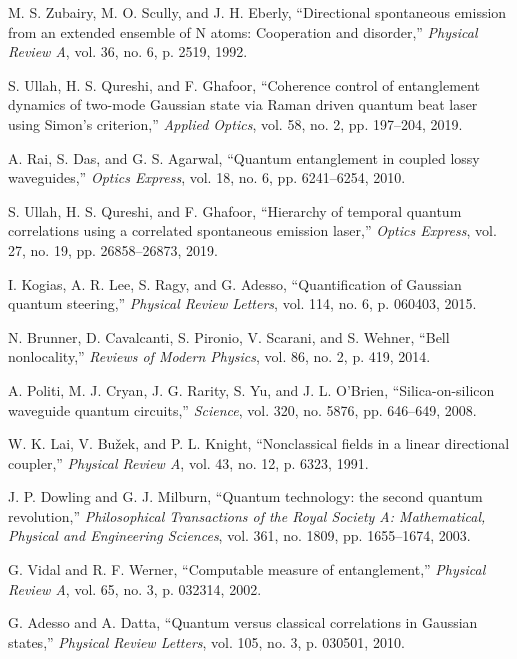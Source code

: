 \begin{thebibliography}{99}
M. S. Zubairy, M. O. Scully, and J. H. Eberly, ``Directional spontaneous emission from an extended ensemble of N atoms: Cooperation and disorder,'' \textit{Physical Review A}, vol. 36, no. 6, p. 2519, 1992.

S. Ullah, H. S. Qureshi, and F. Ghafoor, ``Coherence control of entanglement dynamics of two-mode Gaussian state via Raman driven quantum beat laser using Simon's criterion,'' \textit{Applied Optics}, vol. 58, no. 2, pp. 197--204, 2019.

A. Rai, S. Das, and G. S. Agarwal, ``Quantum entanglement in coupled lossy waveguides,'' \textit{Optics Express}, vol. 18, no. 6, pp. 6241--6254, 2010.

S. Ullah, H. S. Qureshi, and F. Ghafoor, ``Hierarchy of temporal quantum correlations using a correlated spontaneous emission laser,'' \textit{Optics Express}, vol. 27, no. 19, pp. 26858--26873, 2019.

I. Kogias, A. R. Lee, S. Ragy, and G. Adesso, ``Quantification of Gaussian quantum steering,'' \textit{Physical Review Letters}, vol. 114, no. 6, p. 060403, 2015.

N. Brunner, D. Cavalcanti, S. Pironio, V. Scarani, and S. Wehner, ``Bell nonlocality,'' \textit{Reviews of Modern Physics}, vol. 86, no. 2, p. 419, 2014.

A. Politi, M. J. Cryan, J. G. Rarity, S. Yu, and J. L. O'Brien, ``Silica-on-silicon waveguide quantum circuits,'' \textit{Science}, vol. 320, no. 5876, pp. 646--649, 2008.

W. K. Lai, V. Bužek, and P. L. Knight, ``Nonclassical fields in a linear directional coupler,'' \textit{Physical Review A}, vol. 43, no. 12, p. 6323, 1991.

J. P. Dowling and G. J. Milburn, ``Quantum technology: the second quantum revolution,'' \textit{Philosophical Transactions of the Royal Society A: Mathematical, Physical and Engineering Sciences}, vol. 361, no. 1809, pp. 1655--1674, 2003.

G. Vidal and R. F. Werner, ``Computable measure of entanglement,'' \textit{Physical Review A}, vol. 65, no. 3, p. 032314, 2002.

G. Adesso and A. Datta, ``Quantum versus classical correlations in Gaussian states,'' \textit{Physical Review Letters}, vol. 105, no. 3, p. 030501, 2010.


\end{thebibliography}
